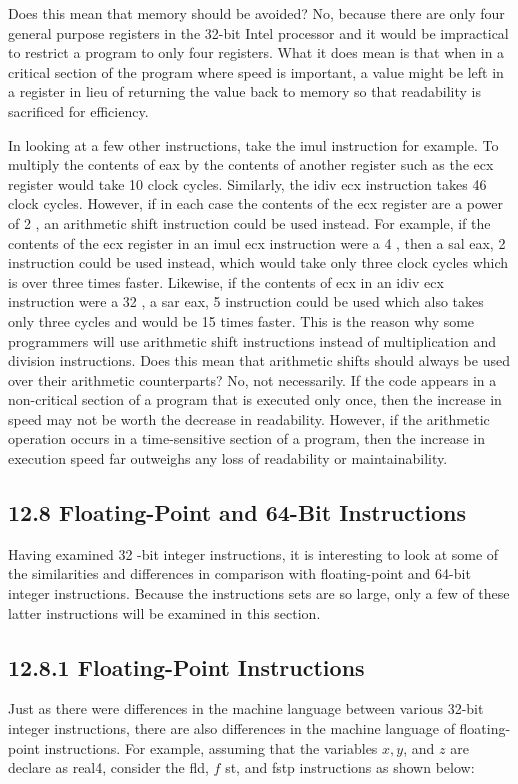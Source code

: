 \documentclass[10pt]{article}
\begin{document}
Does this mean that memory should be avoided? No, because there are only four general purpose registers in the 32-bit Intel processor and it would be impractical to restrict a program to only four registers. What it does mean is that when in a critical section of the program where speed is important, a value might be left in a register in lieu of returning the value back to memory so that readability is sacrificed for efficiency.

In looking at a few other instructions, take the imul instruction for example. To multiply the contents of eax by the contents of another register such as the ecx register would take 10 clock cycles. Similarly, the idiv ecx instruction takes 46 clock cycles. However, if in each case the contents of the ecx register are a power of 2 , an arithmetic shift instruction could be used instead. For example, if the contents of the ecx register in an imul ecx instruction were a 4 , then a sal eax, 2 instruction could be used instead, which would take only three clock cycles which is over three times faster. Likewise, if the contents of ecx in an idiv ecx instruction were a 32 , a sar eax, 5 instruction could be used which also takes only three cycles and would be 15 times faster. This is the reason why some programmers will use arithmetic shift instructions instead of multiplication and division instructions. Does this mean that arithmetic shifts should always be used over their arithmetic counterparts? No, not necessarily. If the code appears in a non-critical section of a program that is executed only once, then the increase in speed may not be worth the decrease in readability. However, if the arithmetic operation occurs in a time-sensitive section of a program, then the increase in execution speed far outweighs any loss of readability or maintainability.

\subsection*{12.8 Floating-Point and 64-Bit Instructions}
Having examined 32 -bit integer instructions, it is interesting to look at some of the similarities and differences in comparison with floating-point and 64-bit integer instructions. Because the instructions sets are so large, only a few of these latter instructions will be examined in this section.

\subsection*{12.8.1 Floating-Point Instructions}
Just as there were differences in the machine language between various 32-bit integer instructions, there are also differences in the machine language of floating-point instructions. For example, assuming that the variables $x, y$, and $z$ are declare as real4, consider the fld, $f$ st, and fstp instructions as shown below:
\end{document}
